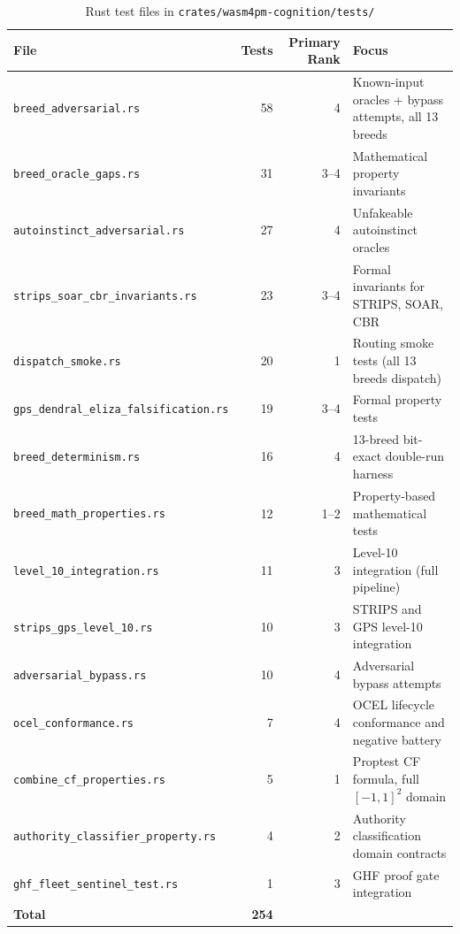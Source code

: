\begin{table}[h]
\centering
\caption{Rust test files in \texttt{crates/wasm4pm-cognition/tests/}}
\label{tab:rust-tests}
\begin{tabular}{lrrl}
\hline
\textbf{File} & \textbf{Tests} & \textbf{Primary Rank} & \textbf{Focus} \\
\hline
\texttt{breed\_adversarial.rs}            & 58 & 4 & Known-input oracles + bypass attempts, all 13 breeds \\
\texttt{breed\_oracle\_gaps.rs}           & 31 & 3--4 & Mathematical property invariants \\
\texttt{autoinstinct\_adversarial.rs}     & 27 & 4 & Unfakeable autoinstinct oracles \\
\texttt{strips\_soar\_cbr\_invariants.rs} & 23 & 3--4 & Formal invariants for STRIPS, SOAR, CBR \\
\texttt{dispatch\_smoke.rs}               & 20 & 1 & Routing smoke tests (all 13 breeds dispatch) \\
\texttt{gps\_dendral\_eliza\_falsification.rs} & 19 & 3--4 & Formal property tests \\
\texttt{breed\_determinism.rs}            & 16 & 4 & 13-breed bit-exact double-run harness \\
\texttt{breed\_math\_properties.rs}       & 12 & 1--2 & Property-based mathematical tests \\
\texttt{level\_10\_integration.rs}        & 11 & 3 & Level-10 integration (full pipeline) \\
\texttt{strips\_gps\_level\_10.rs}        & 10 & 3 & STRIPS and GPS level-10 integration \\
\texttt{adversarial\_bypass.rs}           & 10 & 4 & Adversarial bypass attempts \\
\texttt{ocel\_conformance.rs}             &  7 & 4 & OCEL lifecycle conformance and negative battery \\
\texttt{combine\_cf\_properties.rs}       &  5 & 1 & Proptest CF formula, full $[-1,1]^2$ domain \\
\texttt{authority\_classifier\_property.rs} & 4 & 2 & Authority classification domain contracts \\
\texttt{ghf\_fleet\_sentinel\_test.rs}    &  1 & 3 & GHF proof gate integration \\
\hline
\textbf{Total}                            & \textbf{254} & & \\
\hline
\end{tabular}
\end{table}

